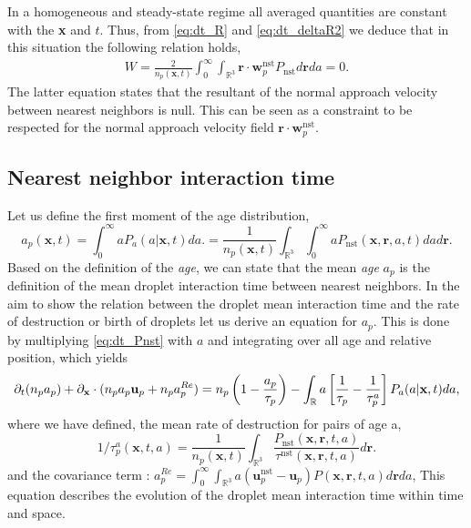 In a homogeneous and steady-state regime all averaged quantities are constant with the \textbf{x} and $t$.   
Thus, from \ref{eq:dt_R} and \ref{eq:dt_deltaR2} we deduce that in this situation the following relation holds, 
\begin{align}
    W = \frac{2}{n_p(\textbf{x},t)}
    \int_{0}^\infty
    \int_{\mathbb{R}^3} 
        \textbf{r} \cdot \textbf{w}^\text{nst}_p
    P_\text{nst}
    d\textbf{r}
    da = 0. 
    \label{eq:cdt_for_W}
\end{align}
The latter equation states that the resultant of the normal approach velocity between nearest neighbors is null. 
This can be seen as a constraint to be respected for the normal approach velocity field $\textbf{r}\cdot \textbf{w}_p^\text{nst}$. 



\subsection{Nearest neighbor interaction time}

Let us define the first moment of the age distribution,
\begin{equation}
    a_p(\textbf{x},t) 
    = \int_{0}^{\infty} a P_a(a|\textbf{x},t) da. 
    = \frac{1}{n_p(\textbf{x},t)}
    \int_{\mathbb{R}^3}
    \int_{0}^{\infty} 
    a P_\text{nst}(\textbf{x},\textbf{r},a,t) da d\textbf{r}. 
    \label{eq:a_p}
\end{equation}
Based on the definition of the \textit{age}, we can state that the mean \textit{age} $a_p$ is the definition of the mean droplet interaction time between nearest neighbors.  
In the aim to show the relation between the droplet mean interaction time and the rate of destruction or birth of droplets let us derive an equation for $a_p$. 
This is done by multiplying \ref{eq:dt_Pnst} with $a$ and integrating over all age and relative position, which yields
\begin{equation}
    \pddt (n_p a_p)
    + \pddx \cdot  (n_p a_p \textbf{u}_p + n_p a_p^{Re})
    = 
    n_p\left(1
    - \frac{a_p}{\tau_p}\right)
    - \int_{\mathbb{R}} a \left[
        \frac{1}{\tau_p}
        - \frac{1}{\tau_p^a}
    \right]P_a(a|\textbf{x},t) da,
    \label{eq:dt_a_p}
\end{equation}
where we have defined, the mean rate of destruction for pairs of age a, 
\begin{equation*}
    1/\tau_p^a(\textbf{x},t,a) 
    = \frac{1}{n_p(\textbf{x},t)}\int_{\mathbb{R}^3} \frac{P_\text{nst}(\textbf{x},\textbf{r},t,a)}{\tau^\text{nst}(\textbf{x},\textbf{r},t,a)} d\textbf{r}.
\end{equation*}
and the covariance term : $a^{Re}_p = \int_{0}^\infty\int_{\mathbb{R}^3} a (\textbf{u}^\text{nst}_p - \textbf{u}_p) P(\textbf{x},\textbf{r},t,a) d\textbf{r}da$, 
This equation describes the evolution of the droplet mean interaction time within time and space. 

